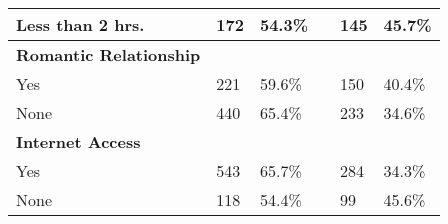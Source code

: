 \documentclass[sigconf]{acmart}
\begin{document}
\begin{table}
\begin{tabular}{llllll}
    Less than 2 hrs.  & 172 & 54.3\% & & 145 & 45.7\% \\
    \midrule
    \textbf{Romantic Relationship} & &  &  &  & \\
    Yes             & 221 & 59.6\% & & 150 & 40.4\%  \\    
    None            & 440 & 65.4\% & & 233 & 34.6\%  \\
    \midrule
    \textbf{Internet Access} & &  &  &  & \\
    Yes             & 543 & 65.7\% & & 284 & 34.3\%  \\    
    None            & 118 & 54.4\% & &  99 & 45.6\%  \\
    \bottomrule
  \end{tabular}
\end{table}

\end{document}
